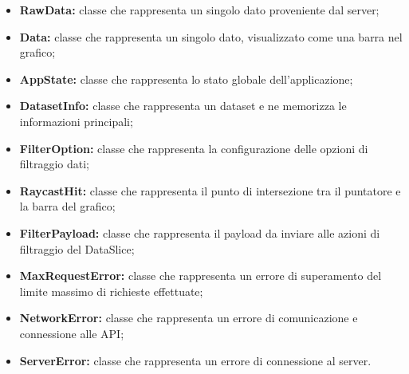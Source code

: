     \begin{itemize}
        \item \textbf{RawData:} classe che rappresenta un singolo dato proveniente dal server;
        \item \textbf{Data:} classe che rappresenta un singolo dato, visualizzato come una barra nel grafico;
        \item \textbf{AppState:} classe che rappresenta lo stato globale dell'applicazione;
        \item \textbf{DatasetInfo:} classe che rappresenta un dataset e ne memorizza le informazioni principali;
        \item \textbf{FilterOption:} classe che rappresenta la configurazione delle opzioni di filtraggio dati;
        \item \textbf{RaycastHit:} classe che rappresenta il punto di intersezione tra il puntatore e la barra del grafico;
        \item \textbf{FilterPayload:} classe che rappresenta il payload da inviare alle azioni di filtraggio del DataSlice;
        \item \textbf{MaxRequestError:} classe che rappresenta un errore di superamento del limite massimo di richieste effettuate;
        \item \textbf{NetworkError:} classe che rappresenta un errore di comunicazione e connessione alle API;
        \item \textbf{ServerError:} classe che rappresenta un errore di connessione al server.
    \end{itemize}
